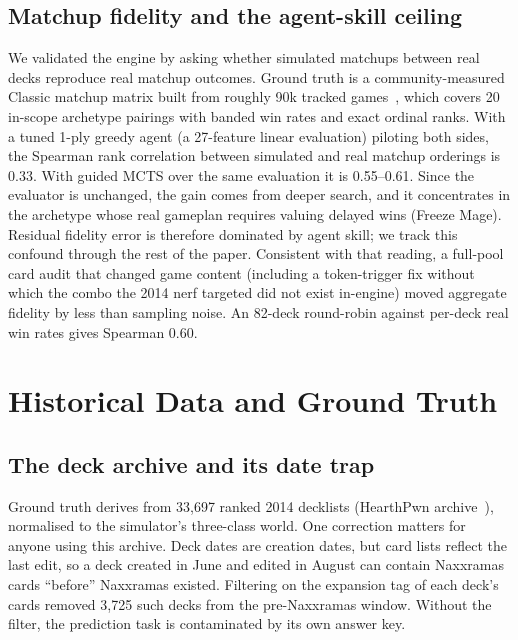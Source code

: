 \documentclass[conference]{IEEEtran}
\begin{document}
\subsection{Matchup fidelity and the agent-skill ceiling}
\label{sec:fidelity}
We validated the engine by asking whether simulated matchups between
real decks reproduce real matchup outcomes. Ground truth is a
community-measured Classic matchup matrix built from roughly 90k
tracked games~\cite{vicious_syndicate}, which covers 20 in-scope
archetype pairings with banded win rates and exact ordinal ranks.
With a tuned 1-ply greedy agent (a 27-feature linear evaluation)
piloting both sides, the Spearman rank correlation between simulated
and real matchup orderings is 0.33. With guided MCTS over the same
evaluation it is 0.55--0.61. Since the evaluator is unchanged, the
gain comes from deeper search, and it concentrates in the archetype
whose real gameplan requires valuing delayed wins (Freeze Mage).
Residual fidelity error is therefore dominated by agent skill; we
track this confound through the rest of the paper. Consistent with
that reading, a full-pool card audit that changed game content
(including a token-trigger fix without which the combo the 2014 nerf
targeted did not exist in-engine) moved aggregate fidelity by less
than sampling noise. An 82-deck round-robin against per-deck real
win rates gives Spearman 0.60.

\section{Historical Data and Ground Truth}
\label{sec:data}

\subsection{The deck archive and its date trap}
Ground truth derives from 33{,}697 ranked 2014 decklists (HearthPwn
archive~\cite{zenodo_dataset}), normalised to the simulator's
three-class world. One correction matters for anyone using this
archive. Deck dates are creation dates, but card lists reflect the
last edit, so a deck created in June and edited in August can
contain Naxxramas cards ``before'' Naxxramas existed. Filtering on
the expansion tag of each deck's cards removed 3{,}725 such decks
from the pre-Naxxramas window. Without the filter, the prediction
task is contaminated by its own answer key.
\end{document}
